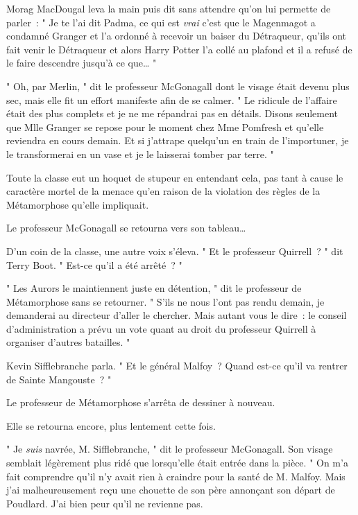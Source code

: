 Morag MacDougal leva la main puis dit sans attendre qu'on lui permette de parler~: " Je te l'ai dit Padma, ce qui est \emph{vrai} c'est que le Magenmagot a condamné Granger et l'a ordonné à recevoir un baiser du Détraqueur, qu'ils ont fait venir le Détraqueur et alors Harry Potter l'a collé au plafond et il a refusé de le faire descendre jusqu'à ce que… "

" Oh, par Merlin, " dit le professeur McGonagall dont le visage était devenu plus sec, mais elle fit un effort manifeste afin de se calmer. " Le ridicule de l'affaire était des plus complets et je ne me répandrai pas en détails. Disons seulement que Mlle Granger se repose pour le moment chez Mme Pomfresh et qu'elle reviendra en cours demain. Et si j'attrape quelqu'un en train de l'importuner, je le transformerai en un vase et je le laisserai tomber par terre. "

Toute la classe eut un hoquet de stupeur en entendant cela, pas tant à cause le caractère mortel de la menace qu'en raison de la violation des règles de la Métamorphose qu'elle impliquait.

Le professeur McGonagall se retourna vers son tableau…

D'un coin de la classe, une autre voix s'éleva. " Et le professeur Quirrell~? " dit Terry Boot. " Est-ce qu'il a été arrêté~? "

" Les Aurors le maintiennent juste en détention, " dit le professeur de Métamorphose sans se retourner. " S'ils ne nous l'ont pas rendu demain, je demanderai au directeur d'aller le chercher. Mais autant vous le dire~: le conseil d'administration a prévu un vote quant au droit du professeur Quirrell à organiser d'autres batailles. "

Kevin Sifflebranche parla. " Et le général Malfoy~? Quand est-ce qu'il va rentrer de Sainte Mangouste~? "

Le professeur de Métamorphose s'arrêta de dessiner à nouveau.

Elle se retourna encore, plus lentement cette fois.

" Je \emph{suis} navrée, M. Sifflebranche, " dit le professeur McGonagall. Son visage semblait légèrement plus ridé que lorsqu'elle était entrée dans la pièce. " On m'a fait comprendre qu'il n'y avait rien à craindre pour la santé de M. Malfoy. Mais j'ai malheureusement reçu une chouette de son père annonçant son départ de Poudlard. J'ai bien peur qu'il ne revienne pas. 
